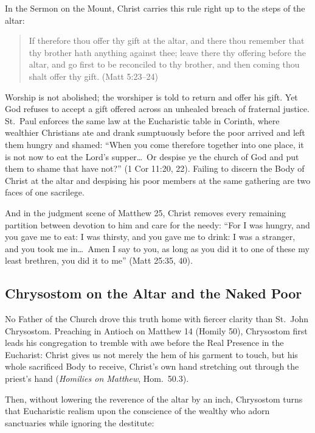 In the Sermon on the Mount, Christ carries this rule right up to the steps of the altar:

\begin{quote}
If therefore thou offer thy gift at the altar, and there thou remember that thy brother hath anything against thee; leave there thy offering before the altar, and go first to be reconciled to thy brother, and then coming thou shalt offer thy gift. (Matt 5:23--24)
\end{quote}

Worship is not abolished; the worshiper is told to return and offer his gift. Yet God refuses to accept a gift offered across an unhealed breach of fraternal justice. St.\ Paul enforces the same law at the Eucharistic table in Corinth, where wealthier Christians ate and drank sumptuously before the poor arrived and left them hungry and shamed: ``When you come therefore together into one place, it is not now to eat the Lord's supper\dots\ Or despise ye the church of God and put them to shame that have not?'' (1 Cor 11:20, 22). Failing to discern the Body of Christ at the altar and despising his poor members at the same gathering are two faces of one sacrilege.

And in the judgment scene of Matthew 25, Christ removes every remaining partition between devotion to him and care for the needy: ``For I was hungry, and you gave me to eat: I was thirsty, and you gave me to drink: I was a stranger, and you took me in\dots\ Amen I say to you, as long as you did it to one of these my least brethren, you did it to me'' (Matt 25:35, 40).

\subsection{Chrysostom on the Altar and the Naked Poor}

No Father of the Church drove this truth home with fiercer clarity than St.\ John Chrysostom. Preaching in Antioch on Matthew 14 (Homily 50), Chrysostom first leads his congregation to tremble with awe before the Real Presence in the Eucharist: Christ gives us not merely the hem of his garment to touch, but his whole sacrificed Body to receive, Christ's own hand stretching out through the priest's hand (\emph{Homilies on Matthew}, Hom.\ 50.3).

Then, without lowering the reverence of the altar by an inch, Chrysostom turns that Eucharistic realism upon the conscience of the wealthy who adorn sanctuaries while ignoring the destitute:


